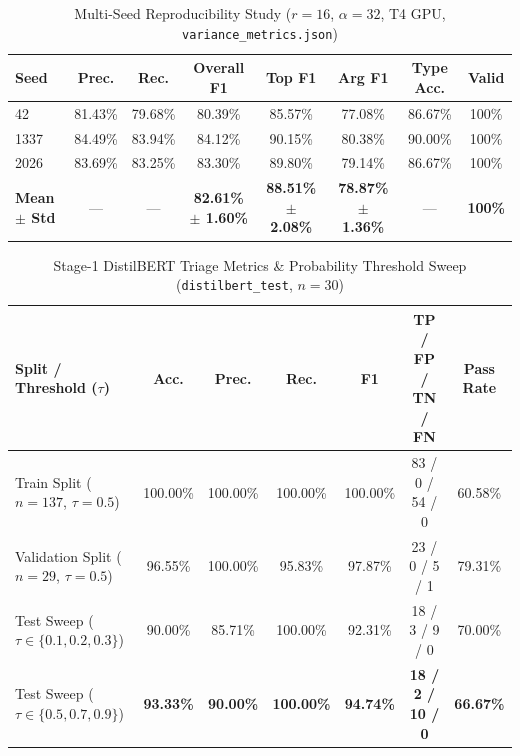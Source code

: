 \documentclass[11pt,a4paper]{article}
\begin{document}
\begin{table}[htbp]
\centering
\caption{Multi-Seed Reproducibility Study ($r=16$, $\alpha=32$, T4 GPU, \texttt{variance\_metrics.json})}
\label{tab:variance}
\small
\begin{tabular}{@{}l c c c c c c c@{}}
\toprule
\textbf{Seed} & \textbf{Prec.} & \textbf{Rec.} & \textbf{Overall F1} & \textbf{Top F1} & \textbf{Arg F1} & \textbf{Type Acc.} & \textbf{Valid} \\
\midrule
42 & 81.43\% & 79.68\% & 80.39\% & 85.57\% & 77.08\% & 86.67\% & 100\% \\
1337 & 84.49\% & 83.94\% & 84.12\% & 90.15\% & 80.38\% & 90.00\% & 100\% \\
2026 & 83.69\% & 83.25\% & 83.30\% & 89.80\% & 79.14\% & 86.67\% & 100\% \\
\midrule
\textbf{Mean $\pm$ Std} & --- & --- & \textbf{82.61\% $\pm$ 1.60\%} & \textbf{88.51\% $\pm$ 2.08\%} & \textbf{78.87\% $\pm$ 1.36\%} & --- & \textbf{100\%} \\
\bottomrule
\end{tabular}
\end{table}

\begin{table}[htbp]
\centering
\caption{Stage-1 DistilBERT Triage Metrics \& Probability Threshold Sweep (\texttt{distilbert\_test}, $n=30$)}
\label{tab:triage_sens}
\small
\begin{tabular}{@{}l c c c c c c@{}}
\toprule
\textbf{Split / Threshold ($\tau$)} & \textbf{Acc.} & \textbf{Prec.} & \textbf{Rec.} & \textbf{F1} & \textbf{TP / FP / TN / FN} & \textbf{Pass Rate} \\
\midrule
Train Split ($n=137$, $\tau=0.5$) & 100.00\% & 100.00\% & 100.00\% & 100.00\% & 83 / 0 / 54 / 0 & 60.58\% \\
Validation Split ($n=29$, $\tau=0.5$) & 96.55\% & 100.00\% & 95.83\% & 97.87\% & 23 / 0 / 5 / 1 & 79.31\% \\ \midrule
Test Sweep ($\tau \in \{0.1, 0.2, 0.3\}$) & 90.00\% & 85.71\% & 100.00\% & 92.31\% & 18 / 3 / 9 / 0 & 70.00\% \\
Test Sweep ($\tau \in \{0.5, 0.7, 0.9\}$) & \textbf{93.33\%} & \textbf{90.00\%} & \textbf{100.00\%} & \textbf{94.74\%} & \textbf{18 / 2 / 10 / 0} & \textbf{66.67\%} \\
\bottomrule
\end{tabular}
\end{table}
\end{document}

